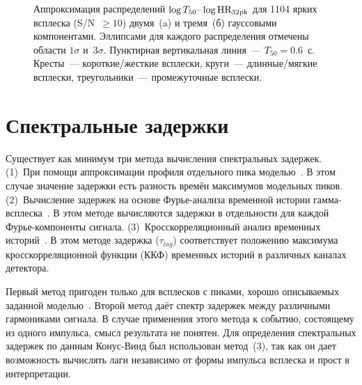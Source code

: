\begin{figure}[h]
  \begin{minipage}[h]{0.5\textwidth}
  \end{minipage}
  \hfill
  \begin{minipage}[h]{0.5\textwidth}
  \end{minipage}
  \caption{Аппроксимация распределений $\log T_{50}\textrm{--}\log \mbox{HR}_{32{\mathrm{pk}}}$ 
  для 1104 ярких всплеска (S/N~$\geq 10$) двумя~(a) и тремя~(б) гауссовыми компонентами. 
  Эллипсами для каждого распределения отмечены области $1\sigma$ и~$3\sigma$. 
  Пунктирная вертикальная линия~--- $T_{50} = 0.6$~с. Кресты~--- короткие/жесткие всплески, 
  круги~--- длинные/мягкие всплески, треугольники~--- промежуточные всплески.}
  \label{img:HRpkvsT50}  
\end{figure}

\clearpage

\section{Спектральные задержки}\label{sec:Lags}
Существует как минимум три метода вычисления спектральных задержек. 
(1)~При помощи аппроксимации  профиля отдельного пика моделью~\citep{Norris_2005, Hakkila_2008}. 
В этом случае значение задержки есть разность времён максимумов модельных пиков. 
(2)~Вычисление задержек на основе Фурье-анализа временной истории гамма-всплеска~\citep{Li_2004}. 
В этом методе вычисляются задержки в отдельности для каждой Фурье-компоненты сигнала. 
(3)~Кросскорреляционный анализ временных историй~\citep{Band_1997, Norris_2000}. 
В этом методе задержка ($\tau_{lag}$) соответствует положению максимума кросскорреляционной 
функции (ККФ) временных историй в различных каналах детектора.

Первый метод пригоден только для всплесков с пиками, хорошо описываемых 
заданной моделью~\citep[формула (1) в][]{Norris_2005}. Второй метод даёт спектр 
задержек между различными гармониками сигнала. В случае применения этого метода 
к событию, состоящему из одного импульса, смысл результата не понятен. 
Для определения спектральных задержек по данным Конус-Винд был использован метод~(3), 
так как он дает возможность вычислять лаги независимо от формы импульса всплеска 
и прост в интерпретации.


